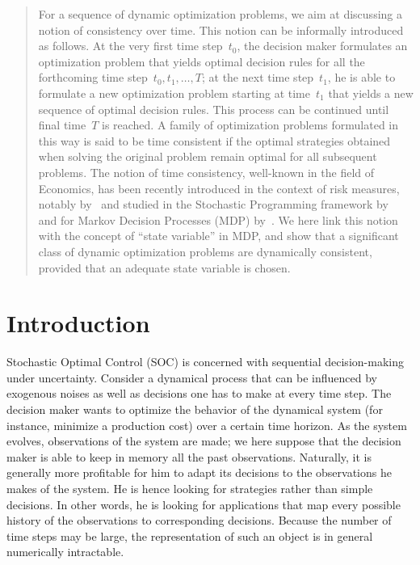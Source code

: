 \documentclass[a4paper]{amsart}
\theoremstyle{plain}
\theoremstyle{definition}
\theoremstyle{remark}
\begin{document}
\begin{abstract}
For a sequence of dynamic optimization problems, we aim at
discussing a notion of consistency over time. This notion can be
informally introduced as follows. At the very first time
step~$t_0$, the decision maker formulates an optimization problem
that yields optimal decision rules for all the forthcoming time
step~$t_0, t_1, \dots, T$; at the next time step~$t_1$, he is able
to formulate a new optimization problem starting at time~$t_1$
that yields a new sequence of optimal decision rules. This process
can be continued until final time~$T$ is reached. A family of
optimization problems formulated in this way is said to be time
consistent if the optimal strategies obtained when solving the
original problem remain optimal for all subsequent problems. The
notion of time consistency, well-known in the field of Economics,
has been recently introduced in the context of risk measures,
notably by~\citet{Artzner_AOR_2007} and studied in the Stochastic
Programming framework by~\citet{Shapiro_ORL_2009} and for Markov
Decision Processes (MDP) by~\citet{Ruszczynski_OO_2009}. We here
link this notion with the concept of ``state variable'' in MDP,
and show that a significant class of dynamic optimization problems
are dynamically consistent, provided that an adequate state
variable is chosen.
\end{abstract}

\maketitle

\section{Introduction}

Stochastic Optimal Control (SOC) is concerned with sequential
decision-making under uncertainty. Consider a dynamical process
that can be influenced by exogenous noises as well as decisions
one has to make at every time step. The decision maker wants to
optimize the behavior of the dynamical system (for instance,
minimize a production cost) over a certain time horizon. As the
system evolves, observations of the system are made; we here
suppose that the decision maker is able to keep in memory all the
past observations. Naturally, it is generally more profitable for
him to adapt its decisions to the observations he makes of the
system. He is hence looking for strategies rather than simple
decisions. In other words, he is looking for applications that map
every possible history of the observations to corresponding
decisions. Because the number of time steps may be large, the
representation of such an object is in general numerically
intractable.
\end{document}
